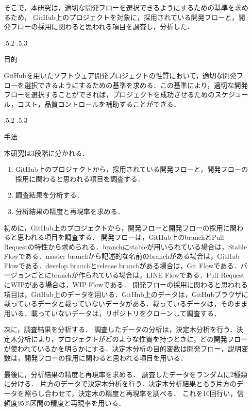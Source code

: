 \documentclass[uplatex,twocolumn]{jsarticle}
\makeatletter
\renewcommand{\section}{%
    \if@slide\clearpage\fi
    \@startsection{section}{1}{\z@}%
    {\Cvs \@plus.5\Cdp \@minus.2\Cdp}%
    {.5\Cvs \@plus.3\Cdp}%
    {\normalfont\raggedright}}
\makeatother
\begin{document}
そこで，本研究は，適切な開発フローを選択できるようにするための基準を求めるため，
GitHub上のプロジェクトを対象に，採用されている開発フローと，開発フローの採用に関わると思われる項目を調査し，分析した．

\section{目的}

GitHubを用いたソフトウェア開発プロジェクトの性質において，適切な開発フローを選択できるようにするための基準を求める．この基準により，適切な開発フローを選択することができれば，プロジェクトを成功させるためのスケジュール，コスト，品質コントロールを補助することができる．

\section{手法}


本研究は3段階に分かれる．
\begin{enumerate}
\item GitHub上のプロジェクトから，採用されている開発フローと，開発フローの採用に関わると思われる項目を調査する．
\item 調査結果を分析する．
\item 分析結果の精度と再現率を求める． 
\end{enumerate}

初めに，GitHub上のプロジェクトから，開発フローと開発フローの採用に関わると思われる項目を調査する．
開発フローは，GitHub上のbranchとPull Requestの特性から求められる．branchにstableが用いられている場合は，Stable Flowである．master branchから記述的な名前のbranchがある場合は，GitHub Flowである．develop branchとrelease branchがある場合は，Git Flowである．バージョンごとにbranchが作られている場合は，LINE Flowである．Pull Request にWIPがある場合は，WIP Flowである．
開発フローの採用に関わると思われる項目は，GitHub上のデータを用いる．GitHub上のデータは，GitHubブラウザに載っているデータと載っていないデータがある．載っているデータは，そのまま用いる．載っていないデータは，リポジトリをクローンして調査する．

次に，調査結果を分析する．
調査したデータの分析は，決定木分析を行う．決定木分析により，プロジェクトがどのような性質を持つときに，どの開発フローが使われているかを明らかにする．决定木分析の目的変数は開発フロー，説明変数は，開発フローの採用に関わると思われる項目を用いる．

最後に，分析結果の精度と再現率を求める．
調査したデータをランダムに2種類に分ける．
片方のデータで決定木分析を行う．决定木分析結果ともう片方のデータを照らし合わせて，決定木の精度と再現率を調べる．
これを10回行い，信頼度95\%区間の精度と再現率を用いる．
\end{document}
